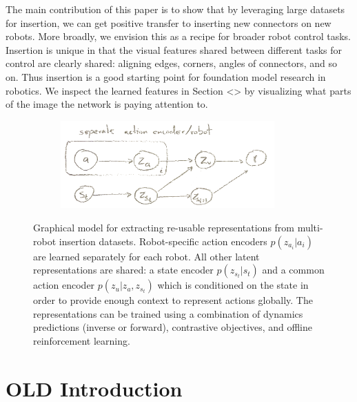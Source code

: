 The main contribution of this paper is to show that by leveraging large datasets for insertion, we can get positive transfer to inserting new connectors on new robots.
More broadly, we envision this as a recipe for broader robot control tasks. Insertion is unique in that the visual features shared between different tasks for control are clearly shared: aligning edges, corners, angles of connectors, and so on. Thus insertion is a good starting point for foundation model research in robotics. We inspect the learned features in Section <> by visualizing what parts of the image the network is paying attention to.

\begin{figure}[t]
    \centering
    \begin{subfigure}[b]{0.99\linewidth}
        \center
        \includegraphics[width=0.9\textwidth]{imgs/pgm.png}
    \end{subfigure}

    \caption{Graphical model for extracting re-usable representations from multi-robot insertion datasets. Robot-specific action encoders $p(z_{a_i}|a_i)$ are learned separately for each robot. All other latent representations are shared: a state encoder $p(z_{s_t}|s_t)$ and a common action encoder $p(z_u|z_a, z_{s_t})$ which is conditioned on the state in order to provide enough context to represent actions globally. The representations can be trained using a combination of dynamics predictions (inverse or forward), contrastive objectives, and offline reinforcement learning. }

    \label{fig:gm}
    \vspace{-0.5cm}
\end{figure}


\section{OLD Introduction}


